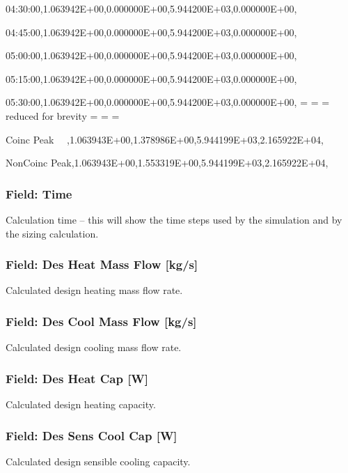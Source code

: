04:30:00,1.063942E+00,0.000000E+00,5.944200E+03,0.000000E+00,

04:45:00,1.063942E+00,0.000000E+00,5.944200E+03,0.000000E+00,

05:00:00,1.063942E+00,0.000000E+00,5.944200E+03,0.000000E+00,

05:15:00,1.063942E+00,0.000000E+00,5.944200E+03,0.000000E+00,

05:30:00,1.063942E+00,0.000000E+00,5.944200E+03,0.000000E+00, = = = reduced for brevity = = =

Coinc Peak~~ ,1.063943E+00,1.378986E+00,5.944199E+03,2.165922E+04,

NonCoinc Peak,1.063943E+00,1.553319E+00,5.944199E+03,2.165922E+04,

\subsubsection{Field: Time}\label{field-time}

Calculation time -- this will show the time steps used by the simulation and by the sizing calculation.

\subsubsection{Field: Des Heat Mass Flow {[}kg/s{]}}\label{field-des-heat-mass-flow-kgs}

Calculated design heating mass flow rate.

\subsubsection{Field: Des Cool Mass Flow {[}kg/s{]}}\label{field-des-cool-mass-flow-kgs}

Calculated design cooling mass flow rate.

\subsubsection{Field: Des Heat Cap {[}W{]}}\label{field-des-heat-cap-w}

Calculated design heating capacity.

\subsubsection{Field: Des Sens Cool Cap {[}W{]}}\label{field-des-sens-cool-cap-w}

Calculated design sensible cooling capacity.

